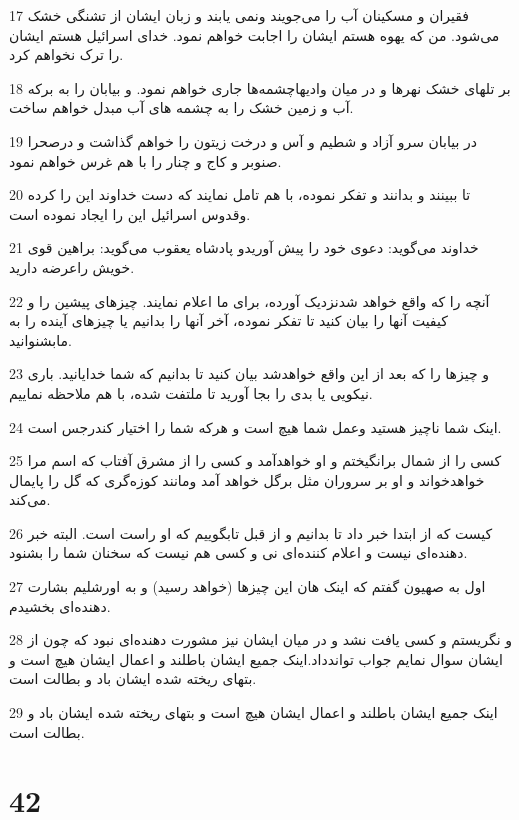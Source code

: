 \par 17 فقیران و مسکینان آب را می‌جویند ونمی یابند و زبان ایشان از تشنگی خشک می‌شود. من که یهوه هستم ایشان را اجابت خواهم نمود. خدای اسرائیل هستم ایشان را ترک نخواهم کرد.
\par 18 بر تلهای خشک نهرها و در میان وادیهاچشمه‌ها جاری خواهم نمود. و بیابان را به برکه آب و زمین خشک را به چشمه های آب مبدل خواهم ساخت.
\par 19 در بیابان سرو آزاد و شطیم و آس و درخت زیتون را خواهم گذاشت و درصحرا صنوبر و کاج و چنار را با هم غرس خواهم نمود.
\par 20 تا ببینند و بدانند و تفکر نموده، با هم تامل نمایند که دست خداوند این را کرده وقدوس اسرائیل این را ایجاد نموده است.
\par 21 خداوند می‌گوید: دعوی خود را پیش آوریدو پادشاه یعقوب می‌گوید: براهین قوی خویش راعرضه دارید.
\par 22 آنچه را که واقع خواهد شدنزدیک آورده، برای ما اعلام نمایند. چیزهای پیشین را و کیفیت آنها را بیان کنید تا تفکر نموده، آخر آنها را بدانیم یا چیزهای آینده را به مابشنوانید.
\par 23 و چیزها را که بعد از این واقع خواهدشد بیان کنید تا بدانیم که شما خدایانید. باری نیکویی یا بدی را بجا آورید تا ملتفت شده، با هم ملاحظه نماییم.
\par 24 اینک شما ناچیز هستید وعمل شما هیچ است و هر‌که شما را اختیار کندرجس است.
\par 25 کسی را از شمال برانگیختم و او خواهدآمد و کسی را از مشرق آفتاب که اسم مرا خواهدخواند و او بر سروران مثل برگل خواهد آمد ومانند کوزه‌گری که گل را پایمال می‌کند.
\par 26 کیست که از ابتدا خبر داد تا بدانیم و از قبل تابگوییم که او راست است. البته خبر دهنده‌ای نیست و اعلام کننده‌ای نی و کسی هم نیست که سخنان شما را بشنود.
\par 27 اول به صهیون گفتم که اینک هان این چیزها (خواهد رسید) و به اورشلیم بشارت دهنده‌ای بخشیدم.
\par 28 و نگریستم و کسی یافت نشد و در میان ایشان نیز مشورت دهنده‌ای نبود که چون از ایشان سوال نمایم جواب تواندداد.اینک جمیع ایشان باطلند و اعمال ایشان هیچ است و بتهای ریخته شده ایشان باد و بطالت است.
\par 29 اینک جمیع ایشان باطلند و اعمال ایشان هیچ است و بتهای ریخته شده ایشان باد و بطالت است.
 
\chapter{42}

